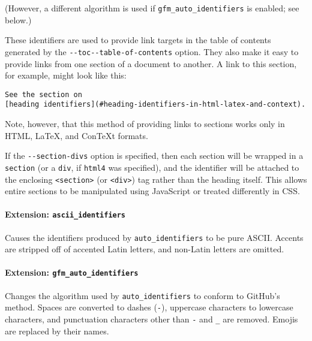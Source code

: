 \documentclass[]{article}
\begin{document}
(However, a different algorithm is used if
\texttt{gfm\_auto\_identifiers} is enabled; see below.)

These identifiers are used to provide link targets in the table of
contents generated by the
\texttt{-\/-toc\textbar{}-\/-table-of-contents} option. They also make
it easy to provide links from one section of a document to another. A
link to this section, for example, might look like this:

\begin{verbatim}
See the section on
[heading identifiers](#heading-identifiers-in-html-latex-and-context).
\end{verbatim}

Note, however, that this method of providing links to sections works
only in HTML, LaTeX, and ConTeXt formats.

If the \texttt{-\/-section-divs} option is specified, then each section
will be wrapped in a \texttt{section} (or a \texttt{div}, if
\texttt{html4} was specified), and the identifier will be attached to
the enclosing \texttt{\textless{}section\textgreater{}} (or
\texttt{\textless{}div\textgreater{}}) tag rather than the heading
itself. This allows entire sections to be manipulated using JavaScript
or treated differently in CSS.

\hypertarget{extension-ascii_identifiers}{%
\paragraph{\texorpdfstring{Extension:
\texttt{ascii\_identifiers}}{Extension: ascii\_identifiers}}\label{extension-ascii_identifiers}}

Causes the identifiers produced by \texttt{auto\_identifiers} to be pure
ASCII. Accents are stripped off of accented Latin letters, and non-Latin
letters are omitted.

\hypertarget{extension-gfm_auto_identifiers}{%
\paragraph{\texorpdfstring{Extension:
\texttt{gfm\_auto\_identifiers}}{Extension: gfm\_auto\_identifiers}}\label{extension-gfm_auto_identifiers}}

Changes the algorithm used by \texttt{auto\_identifiers} to conform to
GitHub's method. Spaces are converted to dashes (\texttt{-}), uppercase
characters to lowercase characters, and punctuation characters other
than \texttt{-} and \texttt{\_} are removed. Emojis are replaced by
their names.
\end{document}
